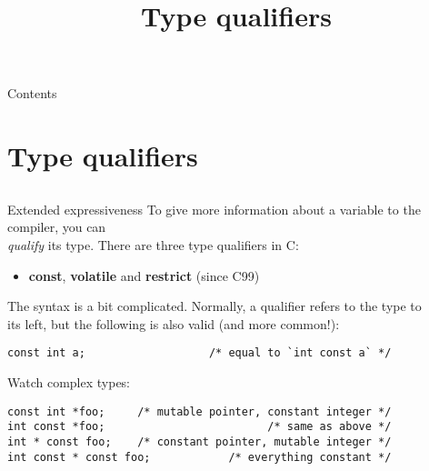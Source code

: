 
\newcommand{\topic}{
	Type qualifiers
}

\title{\topic}
\supertitle{\course}
\date{}



\maketitle

\begin{frame}{Contents}
	\tableofcontents
\end{frame}
\section{Type qualifiers}
\subsection{}

\begin{frame}[fragile]{Extended expressiveness}
To give more information about a variable to the compiler, you can\\
\textit{qualify} its type. There are three type qualifiers in C:\\
\begin{itemize}
	\item \textbf{const}, \textbf{volatile} and \textbf{restrict} (since C99)
\end{itemize}
\bigskip
The syntax is a bit complicated. Normally, a qualifier refers to the type to\\
its left, but the following is also valid (and more common!):
\begin{lstlisting}
const int a;				   /* equal to `int const a` */
\end{lstlisting}
Watch complex types:
\begin{lstlisting}
const int *foo;		/* mutable pointer, constant integer */
int const *foo;							/* same as above */
int * const foo;	/* constant pointer, mutable integer */
int const * const foo; 			  /* everything constant */
\end{lstlisting}
\end{frame}

